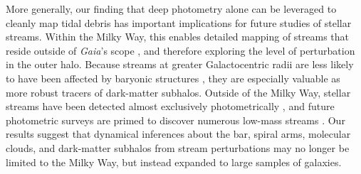 \documentclass[twocolumn]{aastex62}
\newcommand{\gaia}{\textsl{Gaia}}
\newcommand{\sa}[1]{{\color{magenta} SP: #1}}
\begin{document}


More generally, our finding that deep photometry alone can be leveraged to cleanly map tidal debris has important implications for future studies of stellar streams.
Within the Milky Way, this enables detailed mapping of streams that reside outside of \gaia's scope \citep[cf.][]{Ibata:2019}, and therefore exploring the level of perturbation in the outer halo.
Because streams at greater Galactocentric radii are less likely to have been affected by baryonic structures \citep[e.g.,][]{Banik:2019}, they are especially valuable as more robust tracers of dark-matter subhalos.
Outside of the Milky Way, stellar streams have been detected almost exclusively photometrically \citep[e.g.,][]{Martinez-Delgado:2010, Kado-Fong:2018}, and future photometric surveys are primed to discover numerous low-mass streams \citep{Pearson:2019}.
Our results suggest that dynamical inferences about the bar, spiral arms, molecular clouds, and dark-matter subhalos from stream perturbations may no longer be limited to the Milky Way, but instead expanded to large samples of galaxies.

\end{document}
